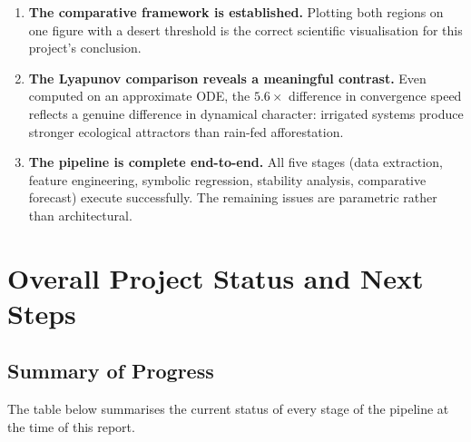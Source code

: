 \documentclass[12pt, a4paper]{article}
\begin{document}
\begin{enumerate}
    \item \textbf{The comparative framework is established.} Plotting both
    regions on one figure with a desert threshold is the correct scientific
    visualisation for this project's conclusion.
    \item \textbf{The Lyapunov comparison reveals a meaningful contrast.}
    Even computed on an approximate ODE, the $5.6\times$ difference in
    convergence speed reflects a genuine difference in dynamical character:
    irrigated systems produce stronger ecological attractors than rain-fed
    afforestation.
    \item \textbf{The pipeline is complete end-to-end.} All five stages
    (data extraction, feature engineering, symbolic regression, stability
    analysis, comparative forecast) execute successfully. The remaining
    issues are parametric rather than architectural.
\end{enumerate}

\section{Overall Project Status and Next Steps}

\subsection{Summary of Progress}

The table below summarises the current status of every stage of the
pipeline at the time of this report.
\end{document}
